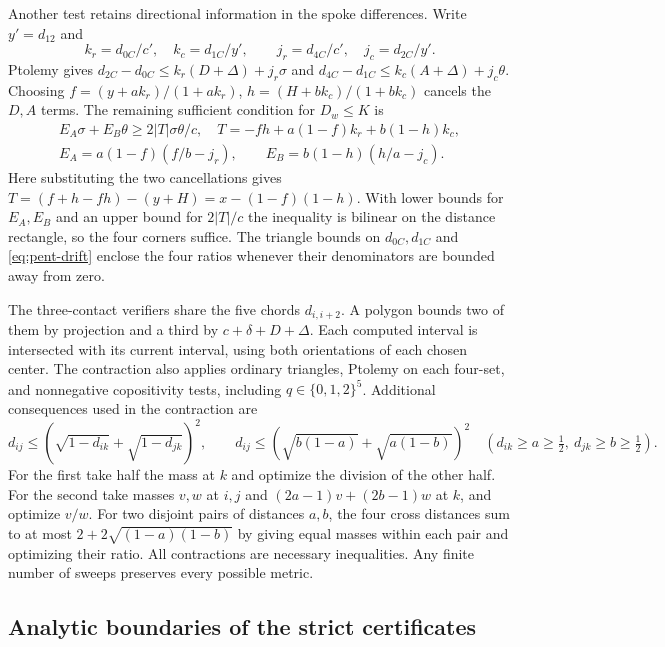 \documentclass[11pt,a4paper]{article}
\theoremstyle{definition}
\begin{document}
Another test retains directional information in the spoke differences.
Write $y'=d_{12}$ and
\[
 k_r=d_{0C}/c',\quad k_c=d_{1C}/y',\qquad
 j_r=d_{4C}/c',\quad j_c=d_{2C}/y'.
\]
Ptolemy gives
$d_{2C}-d_{0C}\le k_r(D+\Delta)+j_r\sigma$ and
$d_{4C}-d_{1C}\le k_c(A+\Delta)+j_c\theta$.
Choosing $f=(y+ak_r)/(1+ak_r)$, $h=(H+bk_c)/(1+bk_c)$ cancels
the $D,A$ terms. The remaining sufficient condition for $D_w\le K$ is
\begin{equation}\label{eq:pent-move}
 \begin{gathered}
 E_A\sigma+E_B\theta\ge 2|T|\sigma\theta/c,\quad
 T=-fh+a(1-f)k_r+b(1-h)k_c,\\
 E_A=a(1-f)(f/b-j_r),\qquad E_B=b(1-h)(h/a-j_c).
 \end{gathered}
\end{equation}
Here substituting the two cancellations
gives $T=(f+h-fh)-(y+H)=x-(1-f)(1-h)$.
With lower bounds for $E_A,E_B$ and an upper bound for $2|T|/c$ the
inequality is bilinear on the distance rectangle, so the four corners
suffice. The triangle bounds on $d_{0C},d_{1C}$ and
\eqref{eq:pent-drift} enclose the four ratios whenever their denominators
are bounded away from zero.

The three-contact verifiers share the five chords $d_{i,i+2}$. A polygon
bounds two of them by projection and a third by $c+\delta+D+\Delta$.
Each computed interval is intersected with its current interval, using
both orientations of each chosen center. The contraction also applies
ordinary triangles, Ptolemy on each four-set, and nonnegative
copositivity tests, including $q\in\{0,1,2\}^5$. Additional consequences
used in the contraction are
\[
 d_{ij}\le(\sqrt{1-d_{ik}}+\sqrt{1-d_{jk}})^2,\qquad
 d_{ij}\le(\sqrt{b(1-a)}+\sqrt{a(1-b)})^2
 \quad(d_{ik}\ge a\ge\tfrac12,\ d_{jk}\ge b\ge\tfrac12).
\]
For the first take half the mass at $k$ and optimize the division of
the other half. For the second take masses $v,w$ at $i,j$ and
$(2a-1)v+(2b-1)w$ at $k$, and optimize $v/w$. For two disjoint pairs
of distances $a,b$, the four cross distances sum to at most
$2+2\sqrt{(1-a)(1-b)}$ by giving equal masses within each pair and
optimizing their ratio. All contractions are necessary inequalities.
Any finite number of sweeps preserves every possible metric.

\subsection{Analytic boundaries of the strict certificates}
\end{document}
